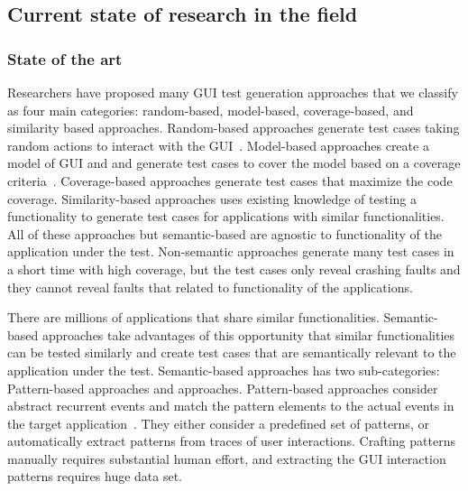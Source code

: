 \subsection{Current state of research in the field }







\subsubsection{State of the art}
Researchers have proposed many GUI test generation approaches that we classify as four main  categories: random-based, model-based, coverage-based, and similarity based approaches.
Random-based approaches generate test cases taking random actions to interact with the GUI~\cite{machiry:dynodroid:FSE:2013,vos:testar:ijismd:2015,ermuth:monkey:ISSTA:2016}. 
Model-based approaches create a model of GUI and and generate test cases to cover the model based on a coverage criteria~\cite{Nguyen:GUITAR:ASEJ:2014,Li:DroidiBot:ICSE-C:2017,Gu:PractivalTest:ICSE:2019,Choi:swift:OOPSLA:2013}. 
Coverage-based approaches generate test cases that maximize the code coverage\cite{Gross:exist:ISSTA:2012,mahmood:evodroid:FSE:2014,dong:TimaMachine:ICSE:2020,cheng:guicat:ASE:2016,Anand:conc:FSE:2012}.
Similarity-based approaches uses existing knowledge of testing a functionality  to generate test cases for applications with similar functionalities. 
All of these approaches but semantic-based are agnostic to functionality of the application under the test. 
Non-semantic approaches generate many test cases in  a short time with high coverage, but the test cases only reveal  crashing faults and they cannot reveal faults that related to functionality of the applications.

\bigskip 
There are millions of applications that share similar functionalities. 
Semantic-based approaches take advantages of this opportunity that similar functionalities can be tested similarly and create test cases that are semantically relevant to the application under the test.
Semantic-based approaches has two sub-categories:
Pattern-based approaches and \testreuse approaches.
Pattern-based approaches consider abstract recurrent events and match the pattern elements to the actual events in the target application~\cite{Moreira:pattern:ISSRE:2013,Morgado:Impact:HCI:2019}. 
They either consider a predefined set of patterns\cite{Mariani:Augusto:ICSE:2018,Hu:appflow:FSE:2018}, or automatically extract patterns from traces of user interactions\cite{linares:mining:MSR:2015,mao:crowd:ASE:2017,Mao:UserPattern:JSS:2021}.
Crafting patterns manually requires substantial human effort, and extracting the GUI interaction patterns requires huge data set.

